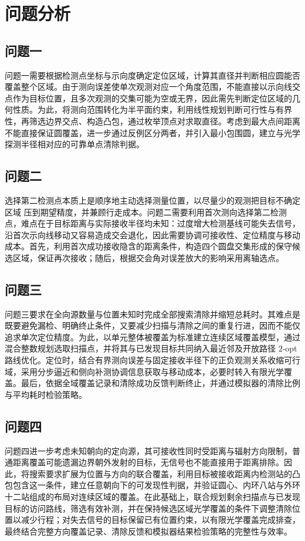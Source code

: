 \documentclass[withoutpreface,bwprint]{cumcmthesis} %
\begin{document}
\section{问题分析}
\subsection{问题一}
问题一需要根据检测点坐标与示向度确定定位区域，计算其直径并判断相应圆能否覆盖整个区域。由于测向误差使单次观测对应一个角度范围，不能直接以示向线交点作为目标位置，且多次观测的交集可能为空或无界，因此需先判断定位区域的几何性质。为此，将测向范围转化为半平面约束，利用线性规划判断可行性与有界性，再筛选边界交点、构造凸包，通过枚举顶点对求取直径。考虑到最大点间距离不能直接保证圆覆盖，进一步通过反例区分两者，并引入最小包围圆，建立与光学探测半径相对应的可靠单点清除判据。

\subsection{问题二}
选择第二检测点本质上是顺序地主动选择测量位置，以尽量少的观测把目标不确定区域
压到期望精度，并兼顾行走成本\cite{vanderhook2012}。问题二需要利用首次测向选择第二检测点，难点在于目标距离与实际接收半径均未知：过度增大检测基线可能失去信号，沿首次示向线移动又容易造成交会退化，因此需要协调可接收性、定位精度与移动成本。首先，利用首次成功接收隐含的距离条件，构造四个圆盘交集形成的保守候选区域，保证再次接收；随后，根据交会角对误差放大的影响采用离轴选点。

\subsection{问题三}
问题三要求在全向源数量与位置未知时完成全部搜索清除并缩短总耗时。其难点是既要避免漏检、明确终止条件，又要减少扫描与清除之间的重复行进，因而不能仅追求单次定位精度。为此，以单元整体被覆盖为标准建立连续区域覆盖模型，通过混合整数规划选取扫描点，并将其与已发现目标共同纳入最近邻及开放路径 $2$-opt 路线优化。定位时，结合有界测向误差与固定接收半径下的正负观测关系收缩可行域，采用分步逼近和侧向补测协调信息获取与移动成本，必要时转入有限光学覆盖。最后，依据全域覆盖记录和清除成功反馈判断终止，并通过模拟器的清除比例与平均耗时检验策略。

\subsection{问题四}
问题四进一步考虑未知朝向的定向源，其可接收性同时受距离与辐射方向限制，普通距离覆盖可能遗漏边界朝外发射的目标，无信号也不能直接用于距离排除。因此，将搜索要求扩展为位置与方向的联合覆盖，利用目标被接收距离内检测站的凸包包含这一条件，建立任意朝向下的可发现性判据，并验证圆心、内环八站与外环十二站组成的布局对连续区域的覆盖。在此基础上，联合规划剩余扫描点与已发现目标的访问路线，筛选有效补测，并在保持候选区域光学覆盖的条件下调整清除位置以减少行程；对失去信号的目标保留已有位置约束，以有限光学覆盖完成排查，最终结合完整方向覆盖记录、清除反馈和模拟器结果检验策略的完整性与效率。
\end{document}
